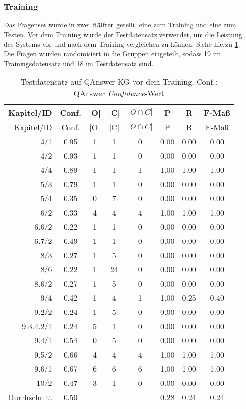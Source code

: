 \subsubsection{Training}

Das Fragenset wurde in zwei Hälften geteilt, eine zum Training und eine zum Testen.
Vor dem Training wurde der Testdatensatz verwendet, um die Leistung des Systems vor und nach dem Training vergleichen zu können.
Siehe hierzu \cref{tab:qanswervortraining}.
Die Fragen wurden randomisiert in die Gruppen eingeteilt, sodass 19 im Trainingsdatensatz und 18 im Testdatensatz sind.

\begin{longtable}{r c c c c c c c}
  \caption[Testdatensatz QAnswer vor Training]{Testdatensatz auf QAnswer KG vor dem Training.
  Conf.: QAnswer \emph{Confidence}-Wert}
  \label{tab:qanswervortraining}
  \\
  \toprule
  Kapitel/ID    & Conf. & |O|   & |C|   & $|O \cap C|$  & P     & R     & F-Maß   \\
  \midrule
  \endfirsthead
  \toprule
  Kapitel/ID    & Conf. & |O|   & |C|   & $|O \cap C|$  & P     & R     & F-Maß   \\
  \midrule
  \endhead
	4/1			& 0.95 & 1 & 1  & 0 & 0.00 & 0.00 & 0.00 \\
	4/2			& 0.93 & 1 & 1  & 0 & 0.00 & 0.00 & 0.00 \\
	4/4			& 0.89 & 1 & 1  & 1 & 1.00 & 1.00 & 1.00 \\
	5/3			& 0.79 & 1 & 1  & 0 & 0.00 & 0.00 & 0.00 \\
	5/4			& 0.35 & 0 & 7  & 0 & 0.00 & 0.00 & 0.00 \\
	6/2			& 0.33 & 4 & 4  & 4 & 1.00 & 1.00 & 1.00 \\
	6.6/2		& 0.22 & 1 & 1  & 0 & 0.00 & 0.00 & 0.00 \\
	6.7/2		& 0.49 & 1 & 1  & 0 & 0.00 & 0.00 & 0.00 \\
	8/3			& 0.27 & 1 & 5  & 0 & 0.00 & 0.00 & 0.00 \\
	8/6			& 0.22 & 1 & 24 & 0 & 0.00 & 0.00 & 0.00 \\
	8.6/2		& 0.27 & 1 & 5  & 0 & 0.00 & 0.00 & 0.00 \\
	9/4			& 0.42 & 1 & 4  & 1 & 1.00 & 0.25 & 0.40 \\
	9.2/2		& 0.24 & 1 & 5  & 0 & 0.00 & 0.00 & 0.00 \\
	9.3.4.2/1	& 0.24 & 5 & 1  & 0 & 0.00 & 0.00 & 0.00 \\
	9.4/1		& 0.54 & 0 & 5  & 0 & 0.00 & 0.00 & 0.00 \\
	9.5/2		& 0.66 & 4 & 4  & 4 & 1.00 & 1.00 & 1.00 \\
	9.6/1		& 0.67 & 6 & 6  & 6 & 1.00 & 1.00 & 1.00 \\
	10/2		& 0.47 & 3 & 1  & 0 & 0.00 & 0.00 & 0.00 \\
  \midrule
  Durchschnitt  & 0.50 &  &    &   & 0.28 & 0.24 & 0.24 \\
  \bottomrule
\end{longtable}

